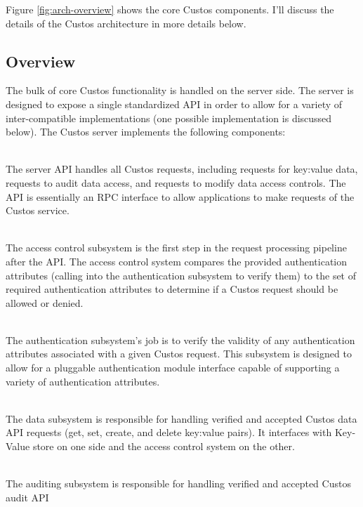 Figure \ref{fig:arch-overview} shows the core Custos components. I'll
discuss the details of the Custos architecture in more details below.

\subsection{Overview}

The bulk of core Custos functionality is handled on the server
side. The server is designed to expose a single standardized API in
order to allow for a variety of inter-compatible implementations (one
possible implementation is discussed below). The Custos server
implements the following components:

\begin{packed_desc}
\item[API] \hfill \\ The server API handles all Custos requests,
  including requests for key:value data, requests to audit data
  access, and requests to modify data access controls. The API is
  essentially an RPC interface to allow applications to make requests
  of the Custos service.
\item[Access Control Subsystem] \hfill \\ The access control subsystem
  is the first step in the request processing pipeline after the
  API. The access control system compares the provided authentication
  attributes (calling into the authentication subsystem to verify
  them) to the set of required authentication attributes to determine
  if a Custos request should be allowed or denied.
\item[Authentication Subsystem] \hfill \\ The authentication
  subsystem's job is to verify the validity of any authentication
  attributes associated with a given Custos request. This subsystem is
  designed to allow for a pluggable authentication module interface
  capable of supporting a variety of authentication attributes.
\item[Data Subsystem] \hfill \\ The data subsystem is responsible for
  handling verified and accepted Custos data API requests (get, set,
  create, and delete key:value pairs). It interfaces with Key-Value
  store on one side and the access control system on the other.
\item[Auditing Subsystem] \hfill \\ The auditing subsystem is
  responsible for handling verified and accepted Custos audit API

\end{packed_desc}
